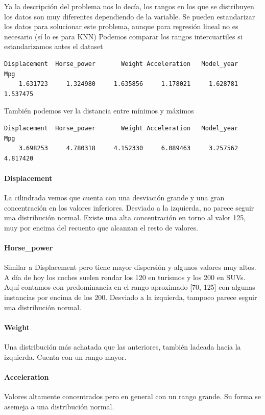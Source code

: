 Ya la descripción del problema nos lo decía, los rangos en los que se distribuyen los datos son muy diferentes dependiendo de la variable. Se pueden estandarizar los datos para solucionar este problema, aunque para regresión lineal no es necesario (sí lo es para KNN)
\vspace{\baselineskip}
Podemos comparar los rangos intercuartiles si estandarizamos antes el dataset

\begin{verbatim}
Displacement  Horse_power       Weight Acceleration   Model_year          Mpg 
    1.631723     1.324980     1.635856     1.178021     1.628781     1.537475 
\end{verbatim}

También podemos ver la distancia entre mínimos y máximos

\begin{verbatim}
Displacement  Horse_power       Weight Acceleration   Model_year          Mpg 
    3.698253     4.780318     4.152330     6.089463     3.257562     4.817420 
\end{verbatim}

\paragraph{Displacement}
La cilindrada vemos que cuenta con una desviación grande y una gran concentración en los valores inferiores. Desviado a la izquierda, no parece seguir una distribución normal. Existe una alta concentración en torno al valor 125, muy por encima del recuento que alcanzan el resto de valores.

\paragraph{Horse\_power}
Similar a Displacement pero tiene mayor dispersión y algunos valores muy altos. A día de hoy los coches suelen rondar los 120 en turismos y los 200 en SUVs. Aquí contamos con predominancia en el rango aproximado {[}70, 125{]} con algunas instancias por encima de los 200.
Desviado a la izquierda, tampoco parece seguir una distribución normal.

\paragraph{Weight}
Una distribución más achatada que las anteriores, también ladeada hacia la izquierda. Cuenta con un rango mayor.

\paragraph{Acceleration}
Valores altamente concentrados pero en general con un rango grande. Su forma se asemeja a una distribución normal.

